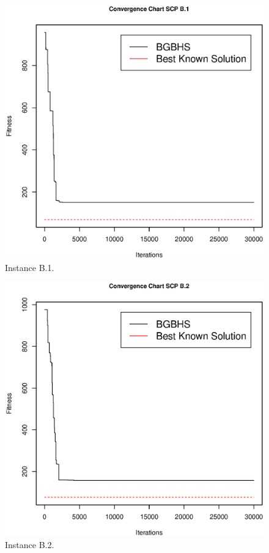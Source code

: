 \begin{figure}[]
\centering
\includegraphics[scale=.45]{Resultados/scpB1.eps}
\caption{Instance B.1.}
\label{fig:Instance.B.1}
\end{figure}

\begin{figure}[]
\centering
\includegraphics[scale=.45]{Resultados/scpB2.eps}
\caption{Instance B.2.}
\label{fig:Instance.B.2}
\end{figure}

